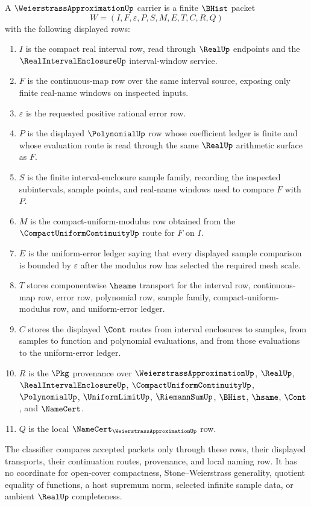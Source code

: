 \begin{definition}
\label{def:weierstrass-approximation-carrier}
A $\WeierstrassApproximationUp$ carrier is a finite $\BHist$ packet
$$
W=(I,F,\varepsilon,P,S,M,E,T,C,R,Q)
$$
with the following displayed rows:
\begin{enumerate}
\item $I$ is the compact real interval row, read through $\RealUp$ endpoints and the $\RealIntervalEnclosureUp$ interval-window service.
\item $F$ is the continuous-map row over the same interval source, exposing only finite real-name windows on inspected inputs.
\item $\varepsilon$ is the requested positive rational error row.
\item $P$ is the displayed $\PolynomialUp$ row whose coefficient ledger is finite and whose evaluation route is read through the same $\RealUp$ arithmetic surface as $F$.
\item $S$ is the finite interval-enclosure sample family, recording the inspected subintervals, sample points, and real-name windows used to compare $F$ with $P$.
\item $M$ is the compact-uniform-modulus row obtained from the $\CompactUniformContinuityUp$ route for $F$ on $I$.
\item $E$ is the uniform-error ledger saying that every displayed sample comparison is bounded by $\varepsilon$ after the modulus row has selected the required mesh scale.
\item $T$ stores componentwise $\hsame$ transport for the interval row, continuous-map row, error row, polynomial row, sample family, compact-uniform-modulus row, and uniform-error ledger.
\item $C$ stores the displayed $\Cont$ routes from interval enclosures to samples, from samples to function and polynomial evaluations, and from those evaluations to the uniform-error ledger.
\item $R$ is the $\Pkg$ provenance over $\WeierstrassApproximationUp$, $\RealUp$, $\RealIntervalEnclosureUp$, $\CompactUniformContinuityUp$, $\PolynomialUp$, $\UniformLimitUp$, $\RiemannSumUp$, $\BHist$, $\hsame$, $\Cont$, and $\NameCert$.
\item $Q$ is the local $\NameCert_{\WeierstrassApproximationUp}$ row.
\end{enumerate}
The classifier compares accepted packets only through these rows, their displayed transports, their continuation routes, provenance, and local naming row. It has no coordinate for open-cover compactness, Stone--Weierstrass generality, quotient equality of functions, a host supremum norm, selected infinite sample data, or ambient $\RealUp$ completeness.
\end{definition}

